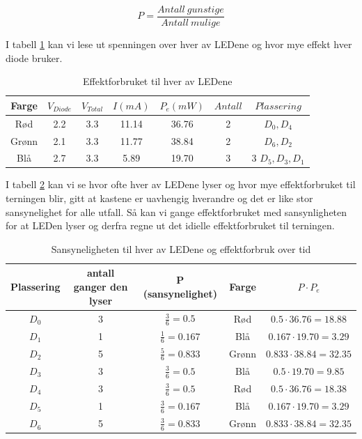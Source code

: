 \begin{equation}
  P = \frac{Antall\ gunstige}{Antall\ mulige}
  \label{eq:8}
\end{equation}

I tabell \ref{table:tab3} kan vi lese ut spenningen over hver av LEDene og hvor mye effekt hver diode bruker.

\begin{table}[!h]
  \centering
  \caption{Effektforbruket til hver av LEDene}
  \begin{tabular}[!h]{ |c|c|c|c|c|c|c| }
    \hline
    Farge &  $V_{Diode}$ & $V_{Total}$ & $I(mA)$ & $P_e(mW)$ & $Antall$ & $Plassering$ \\
    \hline
    Rød & 2.2 & 3.3 & 11.14 & 36.76 & 2 & $D_0, D_4$ \\
    \hline
    Grønn & 2.1 & 3.3 & 11.77 & 38.84 & 2 & $D_6, D_2$ \\
    \hline
    Blå & 2.7 & 3.3 & 5.89 & 19.70 & 3 & 3 $D_5, D_3, D_1$\\
    \hline
  \end{tabular}
  \label{table:tab3}
\end{table}

I tabell \ref{table:tab4} kan vi se hvor ofte hver av LEDene lyser og hvor mye effektforbruket til terningen blir, gitt at kastene er uavhengig hverandre og det er like stor sansynelighet for alle utfall. Så kan vi gange effektforbruket med sansynligheten for at LEDen lyser og derfra regne ut det idielle effektforbruket til terningen.



\begin{table}[!h]
  \centering
  \caption{Sansyneligheten til hver av LEDene og effektforbruk over tid}
  \begin{tabular}[!h]{ |c|c|c|c|c| } 
    \hline
    Plassering & antall ganger den lyser & P (sansynelighet) & Farge & $P \cdot P_e$  \\
    \hline
    $D_0$ & 3 & $\frac{3}{6} = 0.5$ & Rød & $0.5 \cdot 36.76 = 18.88$\\
    \hline
    $D_1$ & 1 & $\frac{1}{6} = 0.167$ & Blå & $0.167 \cdot 19.70 = 3.29$\\
    \hline
    $D_2$ & 5 & $\frac{5}{6} = 0.833$ & Grønn & $0.833 \cdot 38.84 = 32.35$\\
    \hline
    $D_3$ & 3 & $\frac{3}{6} = 0.5$ & Blå & $0.5 \cdot 19.70 = 9.85$\\
    \hline
    $D_4$ & 3 & $\frac{3}{6} = 0.5$ & Rød & $0.5 \cdot 36.76 = 18.38$\\
    \hline
    $D_5$ & 1 & $\frac{3}{6} = 0.167$ & Blå & $0.167 \cdot 19.70 = 3.29$\\
    \hline
    $D_6$ & 5 & $\frac{3}{6} = 0.833$ & Grønn & $0.833 \cdot 38.84 = 32.35$\\
    \hline
  \end{tabular}
  
  \label{table:tab4}
\end{table}

